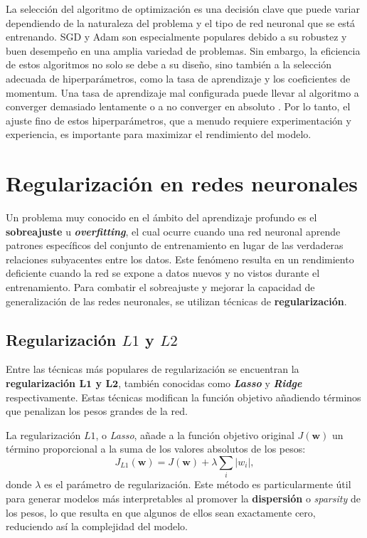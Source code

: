 La selección del algoritmo de optimización es una decisión clave que puede variar dependiendo de la naturaleza del problema y el tipo de red neuronal que se está entrenando. SGD y Adam son especialmente populares debido a su robustez y buen desempeño en una amplia variedad de problemas. Sin embargo, la eficiencia de estos algoritmos no solo se debe a su diseño, sino también a la selección adecuada de hiperparámetros, como la tasa de aprendizaje y los coeficientes de momentum. Una tasa de aprendizaje mal configurada puede llevar al algoritmo a converger demasiado lentamente o a no converger en absoluto \cite{bottou2018optimization}. Por lo tanto, el ajuste fino de estos hiperparámetros, que a menudo requiere experimentación y experiencia, es importante para maximizar el rendimiento del modelo.

\section{Regularización en redes neuronales}

Un problema muy conocido en el ámbito del aprendizaje profundo es el \textbf{sobreajuste} u \textbf{\textit{overfitting}}, el cual ocurre cuando una red neuronal aprende patrones específicos del conjunto de entrenamiento en lugar de las verdaderas relaciones subyacentes entre los datos. Este fenómeno resulta en un rendimiento deficiente cuando la red se expone a datos nuevos y no vistos durante el entrenamiento. Para combatir el sobreajuste y mejorar la capacidad de generalización de las redes neuronales, se utilizan técnicas de \textbf{regularización}.

\subsection{Regularización $L1$ y $L2$}

Entre las técnicas más populares de regularización se encuentran la \textbf{regularización $\mathbf{L1}$ y $\mathbf{L2}$}, también conocidas como \textbf{\textit{Lasso}} y \textbf{\textit{Ridge}} respectivamente. Estas técnicas modifican la función objetivo añadiendo términos que penalizan los pesos grandes de la red.

La regularización $L1$, o \textit{Lasso}, añade a la función objetivo original $J(\mathbf{w})$ un término proporcional a la suma de los valores absolutos de los pesos:
\[
J_{L1}(\mathbf{w}) = J(\mathbf{w}) + \lambda \sum_{i} |w_i|,
\]
donde $\lambda$ es el parámetro de regularización. Este método es particularmente útil para generar modelos más interpretables al promover la \textbf{dispersión} o \textit{sparsity} de los pesos, lo que resulta en que algunos de ellos sean exactamente cero, reduciendo así la complejidad del modelo.

